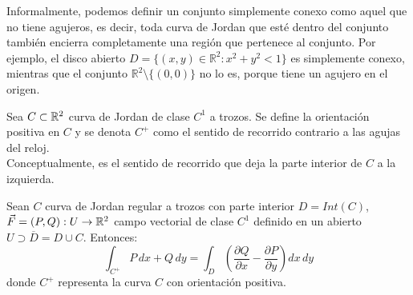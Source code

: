 Informalmente, podemos definir un conjunto simplemente conexo como aquel que no
tiene agujeros, es decir, toda curva de Jordan que esté dentro del conjunto
también encierra completamente una región que pertenece al conjunto. Por
ejemplo, el disco abierto \( D = \{(x, y) \in \mathbb{R}^2 : x^2 + y^2 < 1\} \)
es simplemente conexo, mientras que el conjunto \( \mathbb{R}^2 \setminus
\{(0,0)\} \) no lo es, porque tiene un agujero en el origen.\\

\begin{definición}
Sea $C \subset \mathbb{R}^2$ curva de Jordan de clase $C^1$ a trozos. Se define la orientación positiva en $C$ y se denota $C^+$ como el sentido de recorrido contrario a las agujas del reloj. \\
Conceptualmente, es el sentido de recorrido que deja la parte interior de $C$ a la izquierda.
\end{definición}

\begin{teorema}
    Sean $C$ curva de Jordan regular a trozos con parte interior $D = Int(C)$, $\vec{F} = (P, Q) : U \to \mathbb{R}^2$ campo vectorial de clase $C^1$ definido en un abierto $U \supset \overline{D} = D \cup C$. Entonces:
    $$\int_{C^+} P \, dx + Q \, dy = \int_{D} \left(\frac{\partial Q}{\partial x} - \frac{\partial P}{\partial y}\right) dx \, dy
    $$
    donde $C^+$ representa la curva $C$ con orientación positiva.
\end{teorema}

